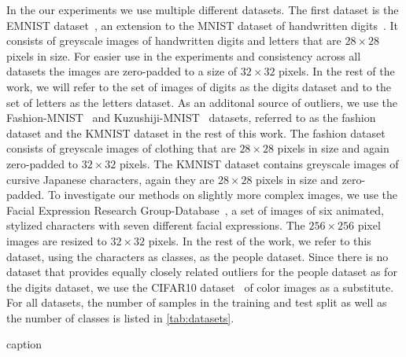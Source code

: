 In the our experiments we use multiple different datasets. The first dataset is the
EMNIST dataset~\citep{cohenEMNISTExtensionMNIST2017}, an extension to the MNIST
dataset of handwritten digits~\citep{lecunGradientbasedLearningApplied1998}. It
consists of greyscale images of handwritten digits and letters that are $28
	\times 28$ pixels in size. For easier use in the experiments and consistency
across all datasets the images are zero-padded to a size of $32 \times 32$
pixels. In the rest of the work, we will refer to the set of images of digits
as the digits dataset and to the set of letters as the letters dataset.
As an additonal source of outliers, we use the
Fashion-MNIST~\citep{xiaoFashionmnistNovelImage2017} and
Kuzushiji-MNIST~\citep{clanuwatDeepLearningClassical2018} datasets, referred to
as the fashion dataset and the KMNIST dataset in the rest of this work. The
fashion dataset consists of greyscale images of clothing that are $28 \times
	28$ pixels in size and again zero-padded to $32 \times 32$ pixels. The KMNIST
dataset contains greyscale images of cursive Japanese characters, again they
are $28 \times 28$ pixels in size and zero-padded.
To investigate our methods on slightly more complex images, we use the Facial
Expression Research Group-Database~\citep{anejaModelingStylizedCharacter2017a},
a set of images of six animated, stylized characters with seven different
facial expressions. The $256 \times 256$ pixel images are resized to $32 \times
	32$ pixels. In the rest of the work, we refer to this dataset, using the
characters as classes, as the people dataset. Since there is no dataset that
provides equally closely related outliers for the people dataset as for the
digits dataset, we use the CIFAR10
dataset~\citep{krizhevskyLearningMultipleLayers2009} of color images as a
substitute. For all datasets, the number of samples in the training and test
split as well as the number of classes is listed in \autoref{tab:datasets}.

\begin{table}[htpb]
	\centering
	\caption{caption}
	\label{tab:datasets}
	
\end{table}
